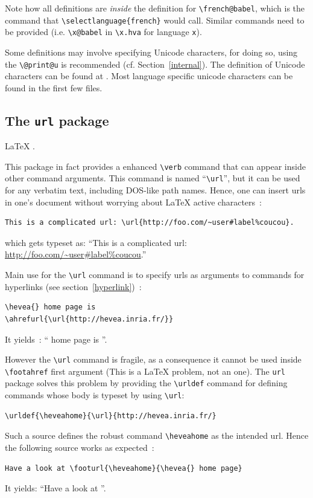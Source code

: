 Note how all definitions are \emph{inside} the definition for \verb+\french@babel+, which is the command that \verb+\selectlanguage{french}+ would call. Similar commands need to be provided (i.e. \verb+\x@babel+ in \verb+\x.hva+ for language \verb+x+).

Some definitions may involve specifying Unicode characters, for doing
so, using the \verb+\@print@u+ is recommended (cf. Section~\ref{internal}).
The definition of Unicode characters can be found at
.
Most language specific unicode characters can be found in the first
few files.

\subsection{The \label{urlpackage}\texttt{url} package}
%
\LaTeX{} .

This package in fact provides a enhanced  \verb+\verb+ command that
can appear inside other command arguments.
This command is named ``\verb+\url+'',
but it can be used for any verbatim text, including DOS-like path
names.
Hence, one can insert urls in one's document without worrying about
\LaTeX{} active characters~:
\begin{verbatim}
This is a complicated url: \url{http://foo.com/~user#label%coucou}.
\end{verbatim}
which gets typeset as: ``This is a complicated url: \url{http://foo.com/~user#label%coucou}.''

Main use for the \verb+\url+ command is to specify urls as arguments to
\hevea{} commands for hyperlinks (see section~\ref{hyperlink})~:
\begin{verbatim}
\hevea{} home page is
\ahrefurl{\url{http://hevea.inria.fr/}}
\end{verbatim}
It yields~: ``\hevea{} home page is
''.

However the \verb+\url+ command is fragile, as a consequence it
cannot be used inside \verb+\footahref+ first argument (This is a
\LaTeX{} problem, not an \hevea{} one).
The \texttt{url} package solves this problem by providing the
\verb+\urldef+ command
for defining commands whose body is typeset by using \verb+\url+:
\begin{verbatim}
\urldef{\heveahome}{\url}{http://hevea.inria.fr/}
\end{verbatim}
%
Such a source defines the robust command \verb+\heveahome+ as the
intended url.
Hence the following source works as expected~:
\begin{verbatim}
Have a look at \footurl{\heveahome}{\hevea{} home page}
\end{verbatim}
It yields: ``Have a look at ''.

